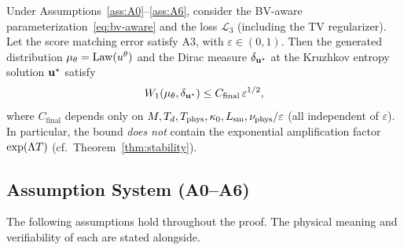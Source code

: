 %

\begin{theorem}\label{appx:thm3}
Under Assumptions~\ref{ass:A0}--\ref{ass:A6}, consider the BV-aware parameterization~\eqref{eq:bv-aware} and the loss $\mathcal{L}_3$ (including the TV regularizer).
Let the score matching error satisfy A3, with $\varepsilon \in (0,1)$.
Then the generated distribution $\mu_{\theta} = \mathrm{Law}(u^{\theta})$ and the Dirac measure $\delta_{\mathbf{u}^{\star}}$ at the Kruzhkov entropy solution $\mathbf{u}^{\star}$ satisfy
\begin{equation}\label{eq:thm3-bound}
  W_{1}(\mu_{\theta}, \delta_{\mathbf{u}^{\star}}) \leq C_{\mathrm{final}} \, \varepsilon^{1/2},
\end{equation}
where $C_{\mathrm{final}}$ depends only on $M, T_d, T_{\mathrm{phys}}, \kappa_0, L_{\mathrm{sm}}, \nu_{\mathrm{phys}}/\varepsilon$ (all independent of $\varepsilon$).
In particular, the bound \emph{does not} contain the exponential amplification factor $\exp(\Lambda T)$ (cf.\ Theorem~\ref{thm:stability}).
\end{theorem}

\subsection{Assumption System (A0--A6)}\label{sec:assumptions}

The following assumptions hold throughout the proof. The physical meaning and verifiability of each are stated alongside.

